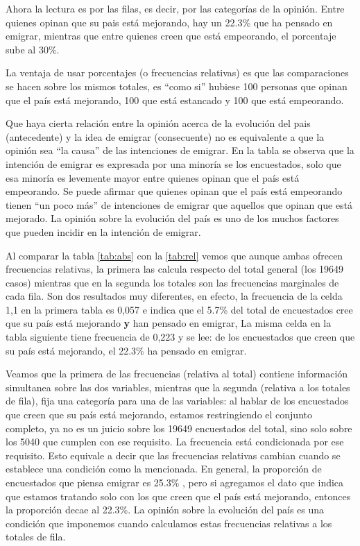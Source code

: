 \documentclass[]{book}
\begin{document}
Ahora la lectura es por las filas, es decir, por las categorías de la opinión. Entre quienes opinan que su pais está mejorando, hay un 22.3\% que ha pensado en emigrar, mientras que entre quienes creen que está empeorando, el porcentaje sube al 30\%.

La ventaja de usar porcentajes (o frecuencias relativas) es que las
comparaciones se hacen sobre los mismos totales, es ``como si'' hubiese
100 personas que opinan que el país está mejorando, 100 que está estancado y 100 que está empeorando.

Que haya cierta relación entre la opinión acerca de la evolución del pais (antecedente) y la idea de emigrar (consecuente) no es equivalente a que la opinión sea ``la causa'' de las intenciones de emigrar. En la tabla se observa que la intención de emigrar es expresada por una minoría se los encuestados, solo que esa minoría es levemente mayor entre quienes opinan que el país está empeorando. Se puede afirmar que quienes opinan que el país está empeorando tienen ``un poco más'' de intenciones de emigrar que aquellos que opinan que está mejorado. La opinión sobre la evolución del país es uno de los muchos factores que pueden incidir en la intención de emigrar.

Al comparar la tabla \ref{tab:abs} con la \ref{tab:rel} vemos que aunque ambas ofrecen frecuencias relativas, la primera las calcula respecto del total general (los
19649 casos) mientras que en la segunda los totales son las frecuencias marginales de cada fila. Son dos resultados muy diferentes, en efecto, la frecuencia de la celda 1,1 en la primera tabla es 0,057 e indica que el 5.7\% del total de encuestados cree que su país está mejorando \textbf{y} han pensado en emigrar, La misma celda en la tabla siguiente tiene frecuencia de 0,223 y se lee: de los encuestados que creen que su país está mejorando, el 22.3\% ha pensado en emigrar.

Veamos que la primera de las frecuencias (relativa al total) contiene
información simultanea sobre las dos variables, mientras que la segunda (relativa a los totales de fila), fija una categoría para una de las variables: al hablar de los encuestados que creen que su país está mejorando, estamos restringiendo el conjunto completo, ya no es un juicio sobre los 19649 encuestados del total, sino solo sobre los 5040 que cumplen con ese requisito. La frecuencia está condicionada por ese requisito. Esto equivale a decir que las frecuencias relativas cambian cuando se establece una condición como la mencionada. En general, la proporción de encuestados que piensa emigrar es 25.3\% , pero si agregamos el dato que indica que estamos tratando solo con los que creen que el país está mejorando, entonces la proporción decae al 22.3\%. La opinión sobre la evolución del país es una condición que imponemos cuando calculamos estas frecuencias relativas a los totales de fila.
\end{document}
